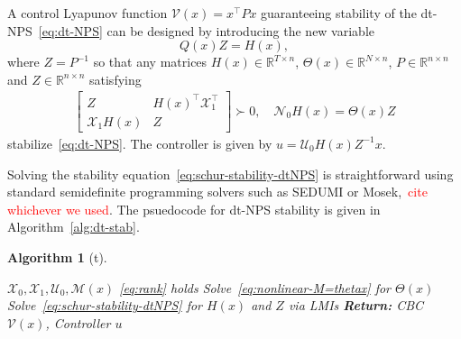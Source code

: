 \documentclass[sigconf]{acmart}
\newtheorem{algorithm}{Algorithm}
\newcommand{\BW}{\textcolor{red}}
\begin{document}
\begin{theorem}
\label{thm:dtNPS-stable}
A control Lyapunov function $\mathcal{V}(x)=x^\top Px$ guaranteeing stability of the dt-NPS~\eqref{eq:dt-NPS} can be designed by introducing the new variable
\begin{equation*}
\label{eq:N0H=ThetaP}
Q(x)Z=H(x),
\end{equation*}
where $Z=P^{-1}$ so that any matrices $H(x)\in\mathbb{R}^{T\times n}$, $\Theta(x)\in\mathbb{R}^{N\times n}$, $P\in\mathbb{R}^{n\times n}$ and $Z\in\mathbb{R}^{n\times n}$ satisfying
\begin{align}
\label{eq:schur-stability-dtNPS}
\begin{bmatrix}
Z                    & H(x)^\top\mathcal{X}_{1}^\top \\
\mathcal{X}_{1} H(x) & Z
\end{bmatrix} \succ 0, \quad \mathcal{N}_{0}H(x)=\Theta(x)Z
\end{align}
stabilize~\eqref{eq:dt-NPS}.
The controller is given by $u=\mathcal{U}_{0}H(x)Z^{-1}x.$
\end{theorem}

Solving the stability equation~\eqref{eq:schur-stability-dtNPS} is straightforward using standard semidefinite programming solvers such as SEDUMI or Mosek,~\BW{cite whichever we used}. The psuedocode for dt-NPS stability is given in Algorithm~\ref{alg:dt-stab}.

\begin{algorithm}[t]
\caption{Hierarchy for dt-NPS Stability}\label{alg:dt-stab}
\begin{algorithmic}[1]
\Require $\mathcal{X}_0,\mathcal{X}_1,\mathcal{U}_0, \mathcal{M}(x)$
\Ensure \eqref{eq:rank} holds
\State Solve~\eqref{eq:nonlinear-M=thetax} for $\Theta(x)$
\State Solve~\eqref{eq:schur-stability-dtNPS} for $H(x)$ and $Z$ via LMIs
\noindent\Statex\textbf{Return:} CBC $\mathcal{V}(x)$, Controller $u$
\end{algorithmic}
\end{algorithm}

\end{document}
